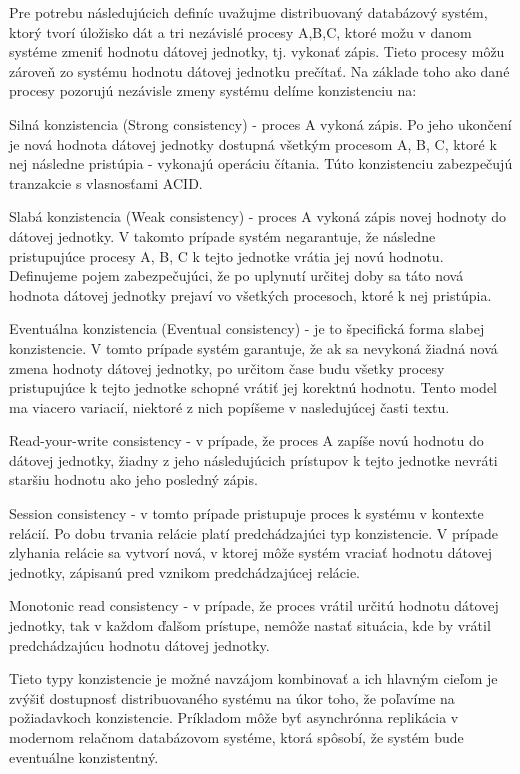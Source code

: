 \documentclass[11pt,twoside,a4paper]{book}
\begin{document}
Pre potrebu následujúcich definíc uvažujme distribuovaný databázový systém, ktorý tvorí úložisko dát a tri nezávislé procesy {A,B,C}, ktoré možu v danom systéme zmeniť hodnotu dátovej jednotky, tj. vykonať zápis. Tieto procesy môžu zároveň zo systému hodnotu dátovej jednotku prečítať. Na základe toho ako dané procesy pozorujú nezávisle zmeny systému delíme konzistenciu \cite{amazonVogel} na:

\noindent Silná konzistencia (Strong consistency) - proces A vykoná zápis. Po jeho ukončení je nová hodnota dátovej jednotky dostupná všetkým procesom {A, B, C}, ktoré k nej následne pristúpia - vykonajú operáciu čítania. Túto konzistenciu zabezpečujú tranzakcie s vlasnosťami ACID.

\noindent Slabá konzistencia (Weak consistency) - proces A vykoná zápis novej hodnoty do dátovej jednotky. V takomto prípade systém negarantuje, že následne pristupujúce procesy {A, B, C} k tejto jednotke vrátia jej novú hodnotu. Definujeme pojem  zabezpečujúci, že po uplynutí určitej doby sa táto nová hodnota dátovej jednotky prejaví vo všetkých procesoch, ktoré k nej pristúpia.

\noindent Eventuálna konzistencia (Eventual consistency) - je to špecifická forma slabej konzistencie. V tomto prípade systém garantuje, že ak sa nevykoná žiadná nová zmena hodnoty dátovej jednotky, po určitom čase budu všetky procesy pristupujúce k tejto jednotke schopné vrátiť jej korektnú hodnotu. Tento model ma viacero variacií, niektoré z nich popíšeme v nasledujúcej časti textu.

\noindent Read-your-write consistency - v prípade, že proces A zapíše novú hodnotu do dátovej jednotky, žiadny z jeho následujúcich prístupov k tejto jednotke nevráti staršiu hodnotu ako jeho posledný zápis.

\noindent Session consistency - v tomto prípade pristupuje proces k systému v kontexte relácií. Po dobu trvania relácie platí predchádzajúci typ konzistencie. V prípade zlyhania relácie sa vytvorí nová, v ktorej môže systém vraciať hodnotu dátovej jednotky, zápisanú pred vznikom predchádzajúcej relácie.

\noindent Monotonic read consistency - v prípade, že proces vrátil určitú hodnotu dátovej jednotky, tak v každom ďalšom prístupe, nemôže nastať situácia, kde by vrátil predchádzajúcu hodnotu dátovej jednotky.

Tieto typy konzistencie je možné navzájom kombinovať a ich hlavným cieľom je zvýšiť dostupnosť distribuovaného systému na úkor toho, že poľavíme na požiadavkoch konzistencie. Príkladom môže byť asynchrónna replikácia v modernom relačnom databázovom systéme, ktorá spôsobí, že systém bude eventuálne konzistentný.
\end{document}
